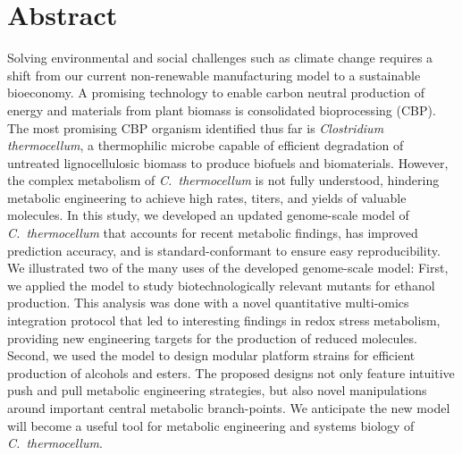 \section*{Abstract}
    Solving environmental and social challenges such as climate change requires a shift from our current non-renewable manufacturing model to a sustainable bioeconomy.
    A promising technology to enable carbon neutral production of energy and materials from plant biomass is consolidated bioprocessing (CBP). The most promising CBP organism identified thus far is \textit{Clostridium thermocellum}, a thermophilic microbe capable of efficient degradation of untreated lignocellulosic biomass to produce biofuels and biomaterials.
    However, the complex metabolism of \textit{C.~thermocellum} is not fully understood, hindering metabolic engineering to achieve high rates, titers, and yields of valuable molecules.
    In this study, we developed an updated genome-scale model of \textit{C.~thermocellum} that accounts for recent metabolic findings, has improved prediction accuracy, and is standard-conformant to ensure easy reproducibility.
    We illustrated two of the many uses of the developed genome-scale model: First, we applied the model to study biotechnologically relevant mutants for ethanol production. This analysis was done with a novel quantitative multi-omics integration protocol that led to interesting findings in redox stress metabolism, providing new engineering targets for the production of reduced molecules. Second, we used the model to design modular platform strains for efficient production of alcohols and esters. The proposed designs not only feature intuitive push and pull metabolic engineering strategies, but also novel manipulations around important central metabolic branch-points.
    We anticipate the new model will become a useful tool for metabolic engineering and systems biology of \textit{C.~thermocellum}.


